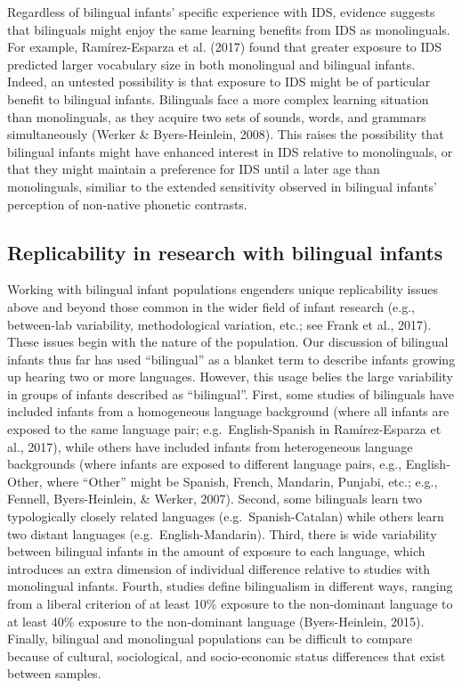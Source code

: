\documentclass[english,,man,floatsintext]{apa6}
\begin{document}
Regardless of bilingual infants' specific experience with IDS, evidence suggests that bilinguals might enjoy the same learning benefits from IDS as monolinguals. For example, Ramírez-Esparza et al. (2017) found that greater exposure to IDS predicted larger vocabulary size in both monolingual and bilingual infants. Indeed, an untested possibility is that exposure to IDS might be of particular benefit to bilingual infants. Bilinguals face a more complex learning situation than monolinguals, as they acquire two sets of sounds, words, and grammars simultaneously (Werker \& Byers-Heinlein, 2008). This raises the possibility that bilingual infants might have enhanced interest in IDS relative to monolinguals, or that they might maintain a preference for IDS until a later age than monolinguals, similiar to the extended sensitivity observed in bilingual infants' perception of non-native phonetic contrasts.

\hypertarget{replicability-in-research-with-bilingual-infants}{%
\subsection{Replicability in research with bilingual infants}\label{replicability-in-research-with-bilingual-infants}}

Working with bilingual infant populations engenders unique replicability issues above and beyond those common in the wider field of infant research (e.g., between-lab variability, methodological variation, etc.; see Frank et al., 2017). These issues begin with the nature of the population. Our discussion of bilingual infants thus far has used \enquote{bilingual} as a blanket term to describe infants growing up hearing two or more languages. However, this usage belies the large variability in groups of infants described as \enquote{bilingual}. First, some studies of bilinguals have included infants from a homogeneous language background (where all infants are exposed to the same language pair; e.g.~English-Spanish in Ramírez-Esparza et al., 2017), while others have included infants from heterogeneous language backgrounds (where infants are exposed to different language pairs, e.g., English-Other, where ``Other'' might be Spanish, French, Mandarin, Punjabi, etc.; e.g., Fennell, Byers-Heinlein, \& Werker, 2007). Second, some bilinguals learn two typologically closely related languages (e.g.~Spanish-Catalan) while others learn two distant languages (e.g.~English-Mandarin). Third, there is wide variability between bilingual infants in the amount of exposure to each language, which introduces an extra dimension of individual difference relative to studies with monolingual infants. Fourth, studies define bilingualism in different ways, ranging from a liberal criterion of at least 10\% exposure to the non-dominant language to at least 40\% exposure to the non-dominant language (Byers-Heinlein, 2015). Finally, bilingual and monolingual populations can be difficult to compare because of cultural, sociological, and socio-economic status differences that exist between samples.
\end{document}
